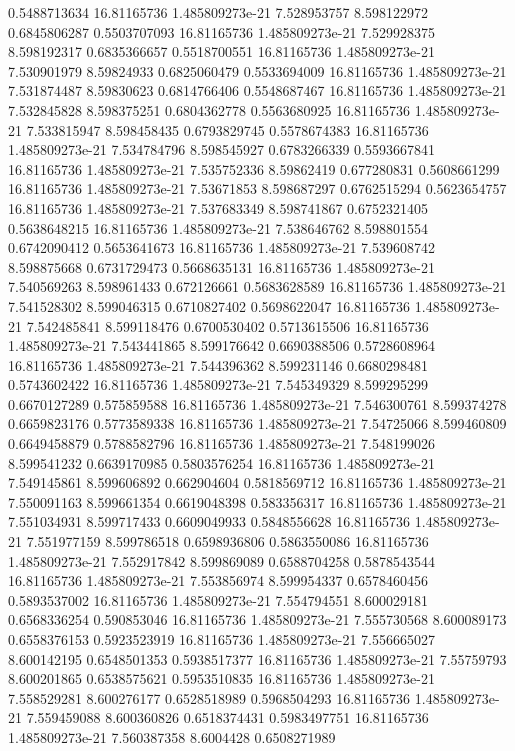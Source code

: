 {0.5488713634 16.81165736 1.485809273e-21 7.528953757 8.598122972 0.6845806287
0.5503707093 16.81165736 1.485809273e-21 7.529928375 8.598192317 0.6835366657
0.5518700551 16.81165736 1.485809273e-21 7.530901979 8.59824933 0.6825060479
0.5533694009 16.81165736 1.485809273e-21 7.531874487 8.59830623 0.6814766406
0.5548687467 16.81165736 1.485809273e-21 7.532845828 8.598375251 0.6804362778
0.5563680925 16.81165736 1.485809273e-21 7.533815947 8.598458435 0.6793829745
0.5578674383 16.81165736 1.485809273e-21 7.534784796 8.598545927 0.6783266339
0.5593667841 16.81165736 1.485809273e-21 7.535752336 8.59862419 0.677280831
0.5608661299 16.81165736 1.485809273e-21 7.53671853 8.598687297 0.6762515294
0.5623654757 16.81165736 1.485809273e-21 7.537683349 8.598741867 0.6752321405
0.5638648215 16.81165736 1.485809273e-21 7.538646762 8.598801554 0.6742090412
0.5653641673 16.81165736 1.485809273e-21 7.539608742 8.598875668 0.6731729473
0.5668635131 16.81165736 1.485809273e-21 7.540569263 8.598961433 0.672126661
0.5683628589 16.81165736 1.485809273e-21 7.541528302 8.599046315 0.6710827402
0.5698622047 16.81165736 1.485809273e-21 7.542485841 8.599118476 0.6700530402
0.5713615506 16.81165736 1.485809273e-21 7.543441865 8.599176642 0.6690388506
0.5728608964 16.81165736 1.485809273e-21 7.544396362 8.599231146 0.6680298481
0.5743602422 16.81165736 1.485809273e-21 7.545349329 8.599295299 0.6670127289
0.575859588 16.81165736 1.485809273e-21 7.546300761 8.599374278 0.6659823176
0.5773589338 16.81165736 1.485809273e-21 7.54725066 8.599460809 0.6649458879
0.5788582796 16.81165736 1.485809273e-21 7.548199026 8.599541232 0.6639170985
0.5803576254 16.81165736 1.485809273e-21 7.549145861 8.599606892 0.662904604
0.5818569712 16.81165736 1.485809273e-21 7.550091163 8.599661354 0.6619048398
0.583356317 16.81165736 1.485809273e-21 7.551034931 8.599717433 0.6609049933
0.5848556628 16.81165736 1.485809273e-21 7.551977159 8.599786518 0.6598936806
0.5863550086 16.81165736 1.485809273e-21 7.552917842 8.599869089 0.6588704258
0.5878543544 16.81165736 1.485809273e-21 7.553856974 8.599954337 0.6578460456
0.5893537002 16.81165736 1.485809273e-21 7.554794551 8.600029181 0.6568336254
0.590853046 16.81165736 1.485809273e-21 7.555730568 8.600089173 0.6558376153
0.5923523919 16.81165736 1.485809273e-21 7.556665027 8.600142195 0.6548501353
0.5938517377 16.81165736 1.485809273e-21 7.55759793 8.600201865 0.6538575621
0.5953510835 16.81165736 1.485809273e-21 7.558529281 8.600276177 0.6528518989
0.5968504293 16.81165736 1.485809273e-21 7.559459088 8.600360826 0.6518374431
0.5983497751 16.81165736 1.485809273e-21 7.560387358 8.6004428 0.6508271989
}
